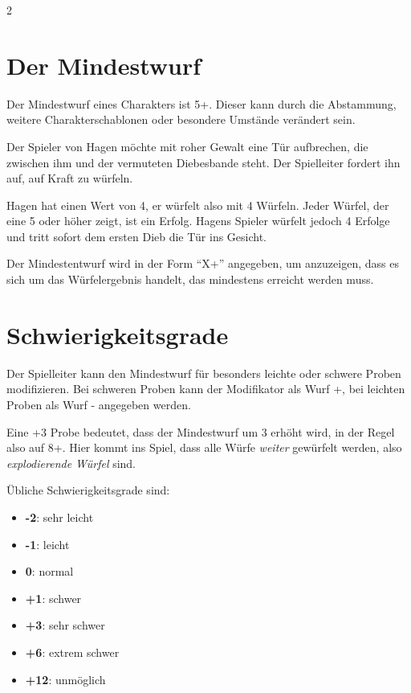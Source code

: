 \begin{multicols}{2}
\section{Der Mindestwurf}

Der Mindestwurf eines Charakters ist 5+. Dieser kann durch die Abstammung, weitere Charakterschablonen oder besondere Umstände verändert sein.

\begin{pexample}[Beispiel]
Der Spieler von Hagen möchte mit roher Gewalt eine Tür aufbrechen, die zwischen ihm und der vermuteten Diebesbande steht. Der Spielleiter fordert ihn auf, auf Kraft zu würfeln.

Hagen hat einen Wert von 4, er würfelt also mit 4 Würfeln. Jeder Würfel, der eine 5 oder höher zeigt, ist ein Erfolg. Hagens Spieler würfelt jedoch 4 Erfolge und tritt sofort dem ersten Dieb die Tür ins Gesicht.
\end{pexample}

Der Mindestentwurf wird in der Form ``X+'' angegeben, um anzuzeigen, dass es sich um das Würfelergebnis handelt, das mindestens erreicht werden muss.

\section{Schwierigkeitsgrade}

Der Spielleiter kann den Mindestwurf für besonders leichte oder schwere Proben modifizieren. Bei schweren Proben kann der Modifikator als Wurf +, bei leichten Proben als Wurf - angegeben werden.

Eine +3 Probe bedeutet, dass der Mindestwurf um 3 erhöht wird, in der Regel also auf 8+. Hier kommt ins Spiel, dass alle Würfe \textit{weiter} gewürfelt werden, also \textit{explodierende Würfel} sind.

Übliche Schwierigkeitsgrade sind:

\begin{itemize}
    \item \textbf{-2}: sehr leicht
    \item \textbf{-1}: leicht
    \item \textbf{0}: normal
    \item \textbf{+1}: schwer
    \item \textbf{+3}: sehr schwer
    \item \textbf{+6}: extrem schwer
    \item \textbf{+12}: unmöglich
\end{itemize}


\end{multicols}
